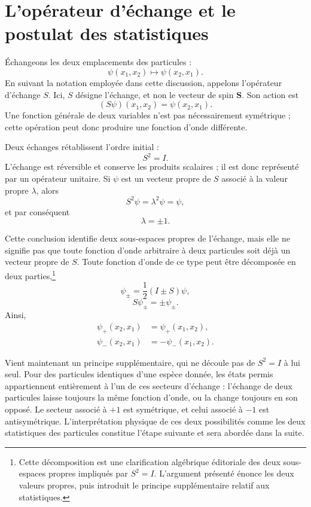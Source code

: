 \section{L’opérateur d’échange et le postulat des statistiques}

Échangeons les deux emplacements des particules :
\begin{equation}
\psi(x_{1},x_{2})\longmapsto\psi(x_{2},x_{1}).
\end{equation}
En suivant la notation employée dans cette discussion, appelons l’opérateur d’échange \(S\). Ici, \(S\) désigne l’échange, et non le vecteur de spin \(\mathbf S\). Son action est
\begin{equation}
(S\psi)(x_{1},x_{2})=\psi(x_{2},x_{1}).
\end{equation}
Une fonction générale de deux variables n’est pas nécessairement symétrique ; cette opération peut donc produire une fonction d’onde différente.

Deux échanges rétablissent l’ordre initial :
\begin{equation}
S^{2}=I.
\end{equation}
L’échange est réversible et conserve les produits scalaires ; il est donc représenté par un opérateur unitaire. Si \(\psi\) est un vecteur propre de \(S\) associé à la valeur propre \(\lambda\), alors
\[
S^{2}\psi=\lambda^{2}\psi=\psi,
\]
et par conséquent
\begin{equation}
\lambda=\pm1.
\end{equation}

Cette conclusion identifie deux sous-espaces propres de l’échange, mais elle ne signifie pas que toute fonction d’onde arbitraire à deux particules soit déjà un vecteur propre de \(S\). Toute fonction d’onde de ce type peut être décomposée en deux parties,\footnote{Cette décomposition est une clarification algébrique éditoriale des deux sous-espaces propres impliqués par \(S^{2}=I\). L’argument présenté énonce les deux valeurs propres, puis introduit le principe supplémentaire relatif aux statistiques.}\begin{equation}
\psi_{\pm}=\frac12(I\pm S)\psi,
\end{equation}
\begin{equation}
S\psi_{\pm}=\pm\psi_{\pm}.
\end{equation}
Ainsi,
\begin{align}
\psi_{+}(x_{2},x_{1})&=\psi_{+}(x_{1},x_{2}),\\
\psi_{-}(x_{2},x_{1})&=-\psi_{-}(x_{1},x_{2}).
\end{align}

Vient maintenant un principe supplémentaire, qui ne découle pas de \(S^{2}=I\) à lui seul. Pour des particules identiques d’une espèce donnée, les états permis appartiennent entièrement à l’un de ces secteurs d’échange : l’échange de deux particules laisse toujours la même fonction d’onde, ou la change toujours en son opposé. Le secteur associé à \(+1\) est symétrique, et celui associé à \(-1\) est antisymétrique. L’interprétation physique de ces deux possibilités comme les deux statistiques des particules constitue l’étape suivante et sera abordée dans la suite.